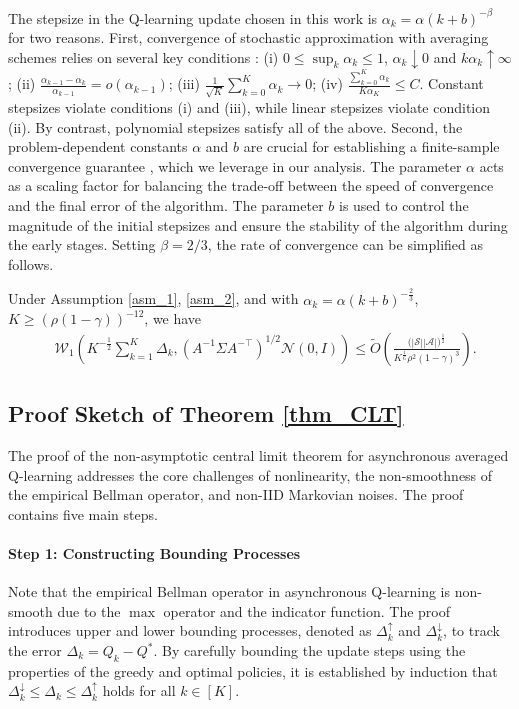 \documentclass{opt2025} %
\begin{document}
The stepsize in the Q-learning update chosen in this work is $\alpha_k=\alpha(k+b)^{-\beta}$ for two reasons. First, convergence of stochastic approximation with averaging schemes relies on several key conditions \citep{polyak1992acceleration,li2023statistical}: (i) $0\leq \sup_k \alpha_k \leq1$, $\alpha_k \downarrow 0$ and $k\alpha_k \uparrow \infty$; (ii) $\frac{\alpha_{k-1}-\alpha_k}{\alpha_{k-1}}=o(\alpha_{k-1})$; (iii) $\frac{1}{\sqrt{K}}\sum_{k=0}^K \alpha_k \rightarrow 0$; (iv) $\frac{\sum_{k=0}^K \alpha_k}{K\alpha_K}\leq C$. Constant stepsizes violate conditions (i) and (iii), while linear stepsizes violate condition (ii). By contrast, polynomial stepsizes satisfy all of the above. Second, the problem-dependent constants $\alpha$ and $b$ are crucial for establishing a finite-sample convergence guarantee \citep{chen2021lyapunov}, which we leverage in our analysis. The parameter $\alpha$ acts as a scaling factor for balancing the trade-off between the speed of convergence and the final error of the algorithm. The parameter $b$ is used to control the magnitude of the initial stepsizes and ensure the stability of the algorithm during the early stages.
Setting $\beta=2/3$, the rate of convergence can be simplified as follows.
\begin{corollary}
Under Assumption \ref{asm_1}, \ref{asm_2}, and with $\alpha_k=\alpha(k+b)^{-\frac{2}{3}}$, $K\geq (\rho(1-\gamma))^{-12}$, we have 
\begin{align*}
&\mathcal{W}_1 \left( K^{-\frac{1}{2}} \sum_{k=1}^K\Delta_{k}, (A^{-1}\Sigma A^{-\top})^{1/2}\mathcal{N}(0,I) \right) \leq \tilde{O}\left( \frac{({|\mathcal{S}||\mathcal{A}|)^{\frac{1}{2}}}}{K^{\frac{1}{6}}\rho^2(1-\gamma)^3} \right).
\end{align*}
\end{corollary}



\subsection{Proof Sketch of Theorem \ref{thm_CLT}}

The proof of the non-asymptotic central limit theorem for asynchronous averaged Q-learning addresses the core challenges of nonlinearity, the non-smoothness of the empirical Bellman operator, and non-IID Markovian noises. The proof contains five main steps.

\paragraph{Step 1: Constructing Bounding Processes} Note that the empirical Bellman operator in asynchronous Q-learning is non-smooth due to the $\max$ operator and the indicator function. The proof introduces upper and lower bounding processes, denoted as $\Delta_k^\uparrow$ and $\Delta_k^\downarrow$, to track the error $\Delta_k = Q_k - Q^*$. By carefully bounding the update steps using the properties of the greedy and optimal policies, it is established by induction that $\Delta_k^\downarrow \le \Delta_k \le \Delta_k^\uparrow$ holds for all $k \in [K]$.
\end{document}
